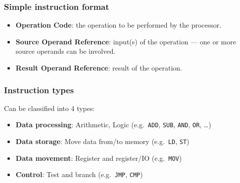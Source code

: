 \subsubsection{Simple instruction format}

\begin{center}\begin{minipage}{\linewidth}\centering
{}
\end{minipage}
\end{center}

\begin{definition}
\leavevmode
\begin{itemize}
  \item \textbf{Operation Code}: the operation to be performed by the
  processor.
  \item \textbf{Source Operand Reference}: input(s) of the operation --- one
  or more source operands can be involved.
  \item \textbf{Result Operand Reference}: result of the operation.
\end{itemize}
\end{definition}

\subsubsection{Instruction types}

Can be classified into 4 types:
\begin{itemize}
  \item \textbf{Data processing}: Arithmetic, Logic \quad (e.g.\ \texttt{ADD},
  \texttt{SUB}, \texttt{AND}, \texttt{OR}, \dots)
  \item \textbf{Data storage}: Move data from/to memory \quad (e.g.\
  \texttt{LD}, \texttt{ST})
  \item \textbf{Data movement}: Register and register/IO \quad (e.g.\
  \texttt{MOV})
  \item \textbf{Control}: Test and branch \quad (e.g.\ \texttt{JMP},
  \texttt{CMP})
\end{itemize}

